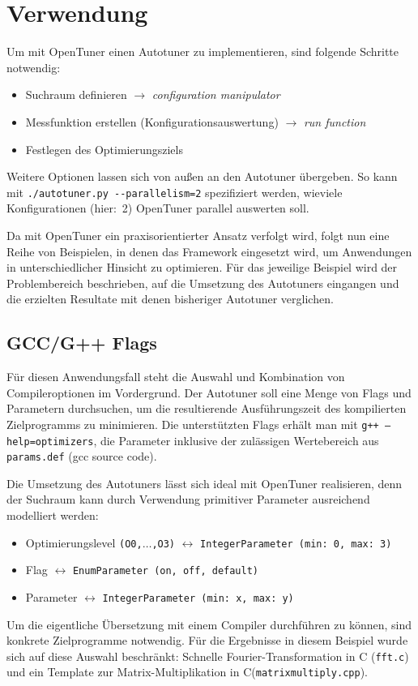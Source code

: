 \documentclass[a4paper,11pt]{scrartcl}
\def\CC{{C\nolinebreak[4]\hspace{-.05em}\raisebox{.4ex}{\tiny\bf ++}}}
\begin{document}
\section{Verwendung}
\label{Verwendung}
Um mit OpenTuner einen Autotuner zu implementieren, sind folgende Schritte notwendig:
\begin{itemize}
  \item Suchraum definieren $\rightarrow$ \emph{configuration manipulator}
  \item Messfunktion erstellen (Konfigurationsauswertung) $\rightarrow$ \emph{run function}
  \item Festlegen des Optimierungsziels
\end{itemize}
Weitere Optionen lassen sich von außen an den Autotuner übergeben. So kann 
mit \texttt{./autotuner.py -{}-parallelism=2} spezifiziert werden, wieviele Konfigurationen
(hier:~2) OpenTuner parallel auswerten soll. \newline

Da mit OpenTuner ein praxisorientierter Ansatz verfolgt wird, folgt nun eine Reihe von
Beispielen, in denen das Framework eingesetzt wird, um Anwendungen in unterschiedlicher 
Hinsicht zu optimieren. Für das jeweilige Beispiel wird der Problembereich beschrieben,
auf die Umsetzung des Autotuners eingangen und die erzielten Resultate mit denen bisheriger
Autotuner verglichen.

\subsection{GCC/G++ Flags}
Für diesen Anwendungsfall steht die Auswahl und Kombination von Compileroptionen
im Vordergrund. Der Autotuner soll eine Menge von Flags und Parametern durchsuchen,
um die resultierende Ausführungszeit des kompilierten Zielprogramms zu minimieren.
Die unterstützten Flags erhält man mit \texttt{g++ --help=optimizers}, die 
Parameter inklusive der zulässigen Wertebereich aus \texttt{params.def} (gcc source code). \newline

Die Umsetzung des Autotuners lässt sich ideal mit OpenTuner realisieren, denn der
Suchraum kann durch Verwendung primitiver Parameter ausreichend modelliert werden:
\begin{itemize}
  \item Optimierungslevel \texttt{(O0,$\ldots$,O3)} $\leftrightarrow$ \texttt{IntegerParameter~(min:~0, max:~3)}
  \item Flag $\leftrightarrow$ \texttt{EnumParameter~(on,~off,~default)}
  \item Parameter $\leftrightarrow$ \texttt{IntegerParameter~(min:~x, max:~y)}
\end{itemize}
Um die eigentliche Übersetzung mit einem Compiler durchführen zu können, sind konkrete
Zielprogramme notwendig. Für die Ergebnisse in diesem Beispiel wurde sich auf diese
Auswahl beschränkt: Schnelle Fourier-Transformation in C (\texttt{fft.c}) und 
ein Template zur Matrix-Multiplikation in \CC (\texttt{matrixmultiply.cpp}). \newline
\end{document}
